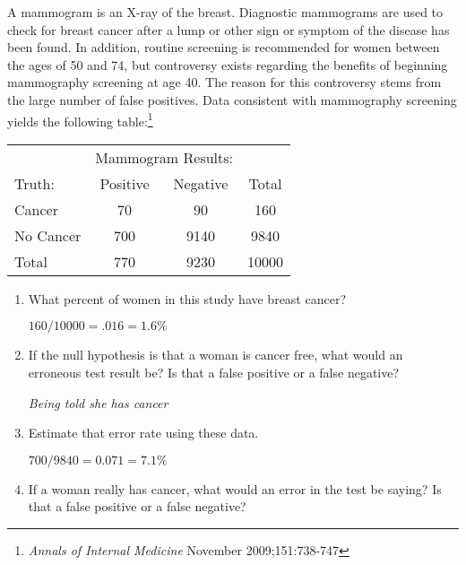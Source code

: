 \begin{enumerate}
A mammogram is an X-ray of the breast.  Diagnostic mammograms are used
to check for breast cancer after a lump or other sign or symptom of
the disease has been found.  In addition, routine screening is
recommended for women between the ages of 50 and 74, but controversy
exists regarding the benefits of beginning mammography screening at
age 40. The reason for this controversy stems from the large number
of false positives.  Data consistent with mammography screening yields
the following table:\footnote{{\it Annals of Internal Medicine}
  November 2009;151:738-747} 


\begin{tabular}{|l|c|c|c|}\hline
   & \multicolumn{2}{|c|}{Mammogram Results:}& \\
Truth: & Positive & Negative & Total\\\hline
Cancer & 70 & 90 & 160\\ \hline
No Cancer& 700& 9140&9840\\ \hline\hline
Total& 770 & 9230 & 10000\\ \hline
\end{tabular}

\begin{enumerate}
   \item   What percent of women in this study have breast cancer?
\begin{students}
  \vspace{\fill}
\end{students} 

\begin{key}
  $160/10000 = .016 = 1.6\%$
\end{key}
   \item   If the null hypothesis is that a woman is cancer free, what
     would an erroneous test result be?  Is that a false positive or a false
     negative? 
\begin{students}
  \vspace{\fill}
\end{students} 

\begin{key}
  {\it Being told she has cancer}
\end{key}
   \item  Estimate that error rate using these data. 
\begin{students}
  \vspace{\fill}
\end{students}

\begin{key}
  {  $700/9840 = 0.071 = 7.1\%$}
\end{key}
   \item  If a woman really has cancer, what would an error in the
     test be saying? Is that a false positive or a false
     negative? 
\begin{students}
  \vspace{\fill}
\end{students} 


\end{enumerate}
\end{enumerate}
